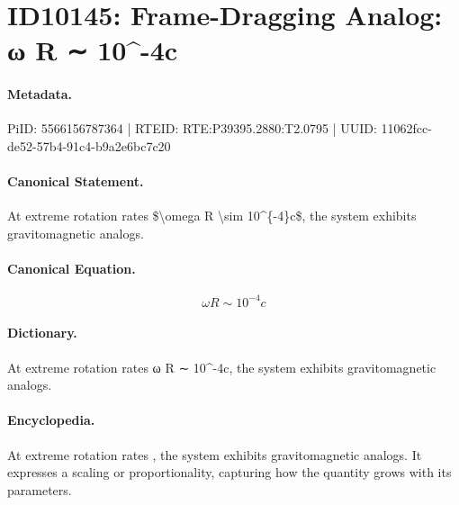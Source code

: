 \section*{ID10145: Frame-Dragging Analog: ω R ∼ 10\textasciicircum{}-4c}
\paragraph{Metadata.}
PiID: 5566156787364 | RTEID: RTE:P39395.2880:T2.0795 | UUID: 11062fcc-de52-57b4-91c4-b9a2e6bc7c20

\paragraph{Canonical Statement.}
At extreme rotation rates \$\textbackslash{}omega R \textbackslash{}sim 10\textasciicircum{}\{-4\}c\$, the system exhibits gravitomagnetic analogs.

\paragraph{Canonical Equation.}
\[
\omega R \sim 10^{-4}c
\]

\paragraph{Dictionary.}
At extreme rotation rates ω R ∼ 10\textasciicircum{}-4c, the system exhibits gravitomagnetic analogs.

\paragraph{Encyclopedia.}
At extreme rotation rates , the system exhibits gravitomagnetic analogs. It expresses a scaling or proportionality, capturing how the quantity grows with its parameters.
